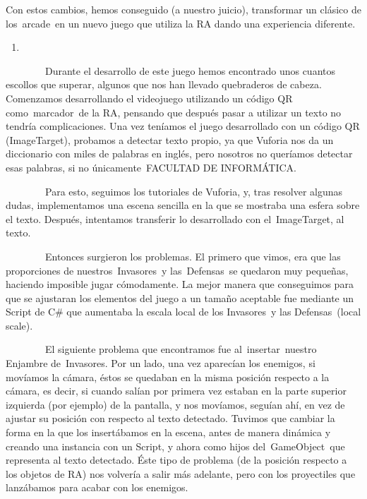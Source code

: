 Con estos cambios, hemos conseguido (a nuestro juicio), transformar un
clásico de los~arcade~en un nuevo juego que utiliza la RA dando una
experiencia diferente.

\begin{enumerate}
\def\labelenumi{\arabic{enumi}.}
\setcounter{enumi}{2}
\item
\end{enumerate}

~~~~~~~~Durante el desarrollo de este juego hemos encontrado unos
cuantos escollos que superar, algunos que nos han llevado quebraderos de
cabeza. Comenzamos desarrollando el videojuego utilizando un código QR
como~marcador~de la RA, pensando que después pasar a utilizar un texto
no tendría complicaciones. Una vez teníamos el juego desarrollado con un
código QR (ImageTarget), probamos a detectar texto propio, ya que
Vuforia nos da un diccionario con miles de palabras en inglés, pero
nosotros no queríamos detectar esas palabras, si no únicamente~FACULTAD
DE INFORMÁTICA.

~~~~~~~~Para esto, seguimos los tutoriales de Vuforia, y, tras resolver
algunas dudas, implementamos una escena sencilla en la que se mostraba
una esfera sobre el texto. Después, intentamos transferir lo
desarrollado con el~ImageTarget, al texto.

~~~~~~~~Entonces surgieron los problemas. El primero que vimos, era que
las proporciones de nuestros~Invasores~y las~Defensas~se quedaron muy
pequeñas, haciendo imposible jugar cómodamente. La mejor manera que
conseguimos para que se ajustaran los elementos del juego a un tamaño
aceptable fue mediante un Script de C\# que aumentaba la escala local de
los Invasores~y las Defensas~(local scale).

~~~~~~~~El siguiente problema que encontramos fue al~insertar~nuestro
Enjambre de~Invasores. Por un lado, una vez aparecían los enemigos, si
movíamos la cámara, éstos se quedaban en la misma posición respecto a la
cámara, es decir, si cuando salían por primera vez estaban en la parte
superior izquierda (por ejemplo) de la pantalla, y nos movíamos, seguían
ahí, en vez de ajustar su posición con respecto al texto detectado.
Tuvimos que cambiar la forma en la que los insertábamos en la escena,
antes de manera dinámica y creando una instancia con un Script, y ahora
como hijos del~GameObject~que representa al texto detectado. Éste tipo
de problema (de la posición respecto a los objetos de RA) nos volvería a
salir más adelante, pero con los proyectiles que lanzábamos para acabar
con los enemigos.

